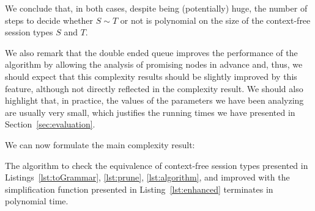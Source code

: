 We conclude that, in both cases, despite being (potentially) huge, the
number of steps to decide whether $S\sim T$ or not is polynomial on 
the size of the context-free session types $S$ and $T$.

We also remark that the double ended queue improves the 
performance of the algorithm by allowing the analysis of promising nodes 
in advance and, thus, we should expect that this complexity
results should be slightly improved by this feature, 
although not directly reflected in the complexity result.
We should also highlight that, in practice, the values of the 
parameters we have been analyzing are usually very small,
which justifies the running times we have presented in 
Section~\ref{sec:evaluation}.

We can now formulate the main complexity result:

\begin{theorem}
	The algorithm to check the equivalence of context-free 
	session types presented in Listings~\ref{lst:toGrammar},
	\ref{lst:prune}, \ref{lst:algorithm}, and improved with the
	simplification function presented in Listing~\ref{lst:enhanced}
	terminates in polynomial time.
\end{theorem}


























